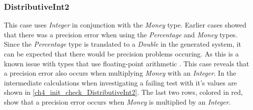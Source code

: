 \subsubsection{DistributiveInt2}
\label{ssct:ch5_distributiveInt2}
This case uses \textit{Integer} in conjunction with the \textit{Money} type. Earlier cases showed that there was a precision error when using the \textit{Percentage} and \textit{Money} types. Since the \textit{Percentage} type is translated to a \textit{Double} in the generated system, it can be expected that there would be precision problems occuring. As this is a known issue with types that use floating-point arithmetic \cite{goldberg1991every}. This case reveals that a precision error also occurs when multiplying \textit{Money} with an \textit{Integer}. In the intermediate calculations when investigating a failing test with it's values are shown in \autoref{ch4_init_check_DistributiveInt2}. The last two rows, colored in red, show that a precision error occurs when \textit{Money} is multiplied by an \textit{Integer}.
\\
